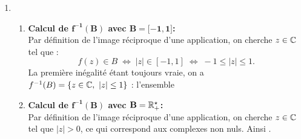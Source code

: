 \documentclass[a4paper, 11pt,reqno]{article}
\begin{document}
\begin{correction}
\begin{enumerate}
\begin{enumerate}
		      \end{enumerate}
		\item
		      \begin{enumerate}
			      \item \textbf{Calcul de $\mathbf{f^{-1}(B)}$ avec $\mathbf{B= \lbrack -1,1\rbrack}$:}\\
			            \noindent  Par d\'efinition de l'image r\'eciproque d'une application, on cherche $z \in \mathbb{C}$ tel que :
			            $$f(z) \in B \; \Leftrightarrow \; |z| \in [-1,1] \; \Leftrightarrow \;  -1\leq |z| \leq 1.$$
			            La premi\`ere in\'egalit\'e \'etant toujours vraie, on a $f^{-1}(B)= \lbrace z\in\mathbb{C},\  |z| \leq 1 \rbrace$ : l'ensemble 
			      \item \textbf{Calcul de $\mathbf{f^{-1}(B)}$ avec $\mathbf{B=\mathbb{R}^\star_+}$:}\\
			            \noindent  Par d\'efinition de l'image r\'eciproque d'une application, on cherche $z \in \mathbb{C}$ tel que $|z| > 0$, ce qui correspond aux complexes non nuls. Ainsi .
		      \end{enumerate}
	\end{enumerate}
\end{correction}





\end{document}
